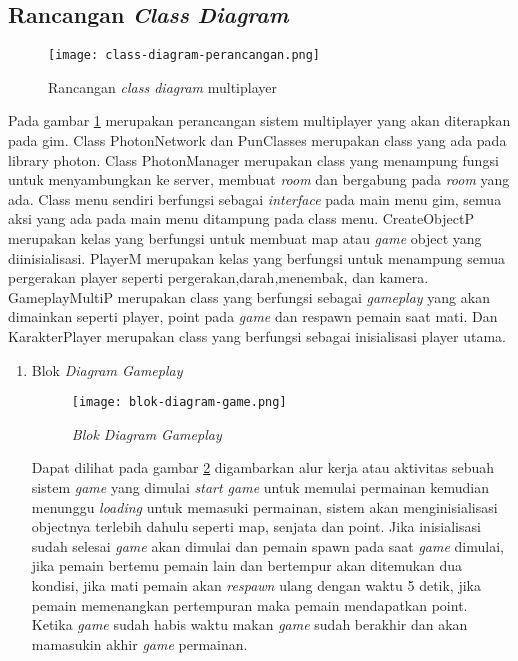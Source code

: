 \subsection{Rancangan \textit{Class Diagram}}
\begin{figure}[h]
   \centering
   \texttt{[image: class-diagram-perancangan.png]}
    \caption{Rancangan \textit{class diagram} multiplayer}
    \label{fig:class-diagram-game}
\end{figure}

Pada gambar \ref{fig:class-diagram-game} merupakan perancangan sistem multiplayer yang akan diterapkan pada gim.
Class PhotonNetwork dan PunClasses merupakan class yang ada pada library photon.
Class PhotonManager merupakan class yang menampung fungsi untuk menyambungkan ke server, membuat \textit{room} dan bergabung pada \textit{room} yang ada.
Class menu sendiri berfungsi sebagai \textit{interface} pada main menu gim, semua aksi yang ada pada main menu ditampung pada class menu.
CreateObjectP merupakan kelas yang berfungsi untuk membuat map atau \textit{game} object yang diinisialisasi.
PlayerM merupakan kelas yang berfungsi untuk menampung semua pergerakan player seperti pergerakan,darah,menembak, dan kamera.
GameplayMultiP merupakan class yang berfungsi sebagai \textit{gameplay} yang akan dimainkan seperti player, point pada \textit{game} dan respawn pemain saat mati.
Dan KarakterPlayer merupakan class yang berfungsi sebagai inisialisasi player utama.
\begin{enumerate}
    \item Blok \textit{Diagram Gameplay}
    \begin{figure}[h]
        \centering
        \texttt{[image: blok-diagram-game.png]}
        \caption{\textit{Blok Diagram Gameplay}}
        \label{fig:aclass-diagram-game}
    \end{figure}

    Dapat dilihat pada gambar \ref{fig:aclass-diagram-game} digambarkan alur kerja atau aktivitas sebuah sistem \textit{game} yang dimulai \textit{start game} untuk memulai permainan kemudian menunggu \textit{loading} untuk memasuki permainan, sistem akan menginisialisasi objectnya terlebih dahulu seperti map, senjata dan point.
    Jika inisialisasi sudah selesai \textit{game} akan dimulai dan pemain spawn pada saat \textit{game} dimulai, jika pemain bertemu pemain lain dan bertempur akan ditemukan dua kondisi, jika mati pemain akan \textit{respawn} ulang dengan waktu 5 detik, jika pemain memenangkan pertempuran maka pemain mendapatkan point.
    Ketika \textit{game} sudah habis waktu makan \textit{game} sudah berakhir dan akan mamasukin akhir \textit{game} permainan.
\end{enumerate}
\newpage

